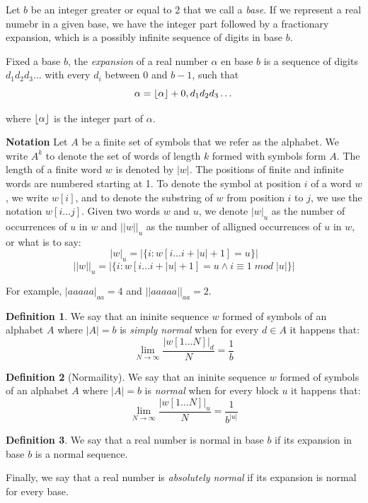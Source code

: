 \documentclass[11pt,a4paper]{tesis}
\theoremstyle{definition}
\newtheorem{definition}{Definition}[section]
\DeclarePairedDelimiter{\floor}{\lfloor}{\rfloor}
\begin{document}
Let $b$ be an integer greater or equal to 2 that we call a \textit{base}. If we represent a real numebr in a given base, we have the integer part followed by a fractionary expansion, which is a possibly infinite sequence of digits in base $b$.

Fixed a base $b$, the \textit{expansion} of a real number $\alpha$ en base $b$ is a sequence of digits $d_1d_2d_3\dots$ with every $d_i$ between 0 and $b-1$, such that
$$\alpha = \floor{\alpha} + 0,d_1d_2d_3\dots$$

where $\floor{\alpha}$ is the integer part of $\alpha$.

\textbf{Notation}
Let $A$ be a finite set of symbols that we refer as the alphabet. We write $A^k$ to denote the set of words of length $k$ formed with symbols form $A$. The length of a finite word $w$ is denoted by $|w|$.
The positions of finite and infinite words are numbered starting at 1. To denote the symbol at position $i$ of a word $w$, we write $w[i]$, and to denote the substring of $w$ from position $i$ to $j$, we use the notation $w[i \dots j]$.  
Given two words $w$ and $u$, we denote $|w|_u$ as the number of occurrences of $u$ in $w$ and $||w||_u$ as the number of alligned occurrences of $u$ in $w$, or what is to say:
    $$|w|_u = |\{i: w[i \dots i + |u| + 1] = u\}|$$
    $$||w||_u = |\{i: w[i \dots i + |u| + 1] = u \wedge i \equiv 1 \; mod \; |u| \}|$$

For example, $|aaaaa|_{aa} = 4$ and $||aaaaa||_{aa} = 2$.
\\

\begin{definition}
    We say that an ininite sequence $w$ formed of symbols of an alphabet $A$ where $|A| = b$ is \textit{simply normal} when for every $d \in A$ it happens that:
    $$\lim_{N\to\infty} \frac{|w[1 \dots N]|_d}{N} = \frac{1}{b}$$
\end{definition}

\begin{definition}[Normaility]
    We say that an ininite sequence $w$ formed of symbols of an alphabet $A$ where $|A| = b$ is \textit{normal} when for every block $u$ it happens that:
    $$\lim_{N\to\infty} \frac{|w[1 \dots N]|_u}{N} = \frac{1}{b^{|u|}}$$
\end{definition}

\begin{definition}
    We say that a real number is normal in base $b$ if its expansion in base $b$ is a normal sequence. 
    
    Finally, we say that a real number is \textit{absolutely normal} if its expansion is normal for every base.
\end{definition}
\end{document}
